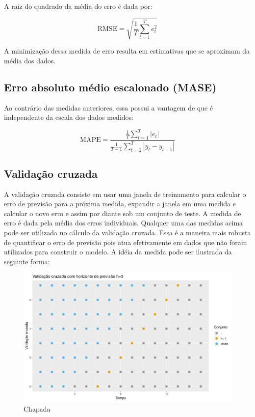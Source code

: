 \documentclass[
	12pt,				%
	openright,			%
	oneside,			%
	a4paper,			%
	english,			%
	french,				%
	spanish,			%
	brazil				%
	]{abntex2}
\begin{document}
A raíz do quadrado da média do erro é dada por:

$$\text{RMSE} = \sqrt{\frac{1}{T}\sum_{t=1}^{T}e_{t}^2}$$

A minimização dessa medida de erro resulta em estimativas que se aproximam da média dos dados.

\subsection{Erro absoluto médio escalonado (MASE)}

Ao contrário das medidas anteriores, essa possui a vantagem de que é independente da escala dos dados medidos:

$$\text{MAPE} = \frac{\frac{1}{T}\sum_{t=1}^T\left|e_t\right|}{\frac{1}{T-1}\sum_{t=2}^{T}\left|y_t-y_{t-1}\right|}$$

\subsection{Validação cruzada}

A validação cruzada consiste em usar uma janela de treinamento para calcular o erro de previsão para a próxima medida, expandir a janela em uma medida e calcular o novo erro e assim por diante sob um conjunto de teste. A medida de erro é dada pela média dos erros individuais. Qualquer uma das medidas acima pode ser utilizada no cálculo da validação cruzada. Essa é a maneira mais robusta de quantificar o erro de previsão pois atua efetivamente em dados que não foram utilizados para construir o modelo. A idéia da medida pode ser ilustrada da seguinte forma:

\begin{figure}[h]
    \centering
	\includegraphics[width=\textwidth]{crossh3}
	\caption{Chapada}
\end{figure}
\FloatBarrier
\end{document}
